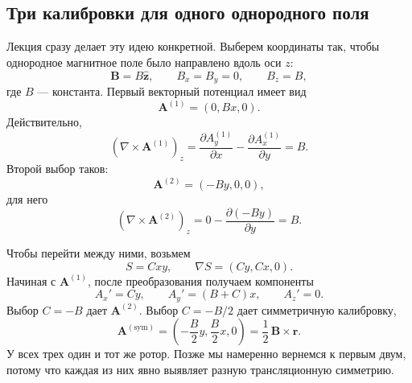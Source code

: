 \subsection{Три калибровки для одного однородного поля}

Лекция сразу делает эту идею конкретной. Выберем координаты так, чтобы однородное магнитное поле было направлено вдоль оси \(z\):
\begin{equation}
  \mathbf B=B\hat{\mathbf z},
  \qquad
  B_x=B_y=0,
  \qquad
  B_z=B,
\end{equation}
где \(B\) — константа. Первый векторный потенциал имеет вид
\begin{equation}
  \mathbf A^{(1)}=(0,Bx,0).
\end{equation}
Действительно,
\begin{equation}
  (\nabla\times\mathbf A^{(1)})_z
  =
  \frac{\partial A_y^{(1)}}{\partial x}
  -
  \frac{\partial A_x^{(1)}}{\partial y}
  =B.
\end{equation}
Второй выбор таков:
\begin{equation}
  \mathbf A^{(2)}=(-By,0,0),
\end{equation}
для него
\begin{equation}
  (\nabla\times\mathbf A^{(2)})_z
  =
  0-\frac{\partial(-By)}{\partial y}
  =B.
\end{equation}

Чтобы перейти между ними, возьмем
\begin{equation}
  S=Cxy,
  \qquad
  \nabla S=(Cy,Cx,0).
\end{equation}
Начиная с \(\mathbf A^{(1)}\), после преобразования получаем компоненты
\begin{equation}
  A_x'=Cy,
  \qquad
  A_y'=(B+C)x,
  \qquad
  A_z'=0.
\end{equation}
Выбор \(C=-B\) дает \(\mathbf A^{(2)}\). Выбор \(C=-B/2\) дает симметричную калибровку,
\begin{equation}
  \mathbf A^{(\mathrm{sym})}
  =
  \left(-\frac{B}{2}y,\frac{B}{2}x,0\right)
  =
  \frac12\,\mathbf B\times\mathbf r.
\end{equation}
У всех трех один и тот же ротор. Позже мы намеренно вернемся к первым двум, потому что каждая из них явно выявляет разную трансляционную симметрию.

\begin{classroomqa}
\end{classroomqa}

